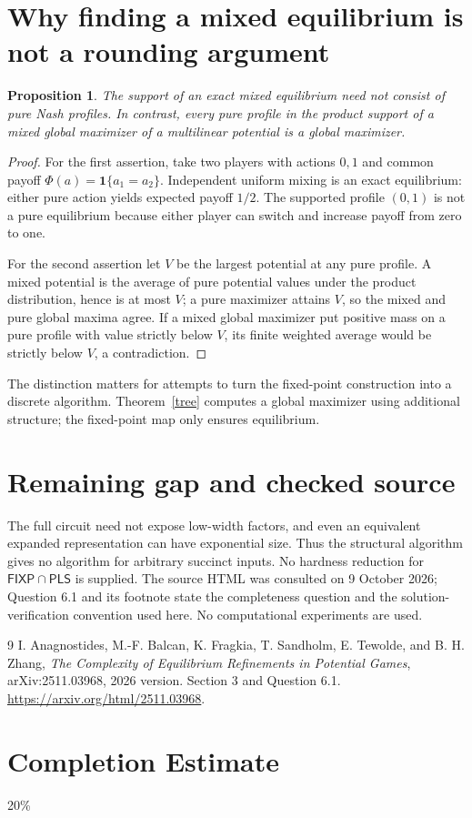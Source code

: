 \documentclass[11pt]{article}
\newtheorem{proposition}[theorem]{Proposition}
\theoremstyle{definition}
\newcommand{\Ind}{\mathbf 1}
\begin{document}
\section{Why finding a mixed equilibrium is not a rounding argument}
\begin{proposition}\label{rounding}
The support of an exact mixed equilibrium need not consist of pure Nash
profiles. In contrast, every pure profile in the product support of a
mixed global maximizer of a multilinear potential is a global maximizer.
\end{proposition}
\begin{proof}
For the first assertion, take two players with actions $0,1$ and common
payoff $\Phi(a)=\Ind\{a_1=a_2\}$. Independent uniform mixing is an exact
equilibrium: either pure action yields expected payoff $1/2$. The supported
profile $(0,1)$ is not a pure equilibrium because either player can switch
and increase payoff from zero to one.

For the second assertion let $V$ be the largest potential at any pure
profile. A mixed potential is the average of pure potential values under
the product distribution, hence is at most $V$; a pure maximizer attains
$V$, so the mixed and pure global maxima agree. If a mixed global maximizer
put positive mass on a pure profile with value strictly below $V$, its
finite weighted average would be strictly below $V$, a contradiction.
\end{proof}
The distinction matters for attempts to turn the fixed-point construction
into a discrete algorithm. Theorem~\ref{tree} computes a global maximizer
using additional structure; the fixed-point map only ensures equilibrium.

\section{Remaining gap and checked source}
The full circuit need not expose low-width factors, and even an equivalent
expanded representation can have exponential size. Thus the structural
algorithm gives no algorithm for arbitrary succinct inputs. No hardness
reduction for $\mathsf{FIXP}\cap\mathsf{PLS}$ is supplied. The source HTML
was consulted on 9 October 2026; Question 6.1 and its footnote state the
completeness question and the solution-verification convention used here.
No computational experiments are used.
\begin{thebibliography}{9}
 I. Anagnostides, M.-F. Balcan, K. Fragkia,
T. Sandholm, E. Tewolde, and B. H. Zhang,
\emph{The Complexity of Equilibrium Refinements in Potential Games},
arXiv:2511.03968, 2026 version. Section 3 and Question 6.1.
\url{https://arxiv.org/html/2511.03968}.
\end{thebibliography}

\section{Completion Estimate}
20\%
\end{document}
